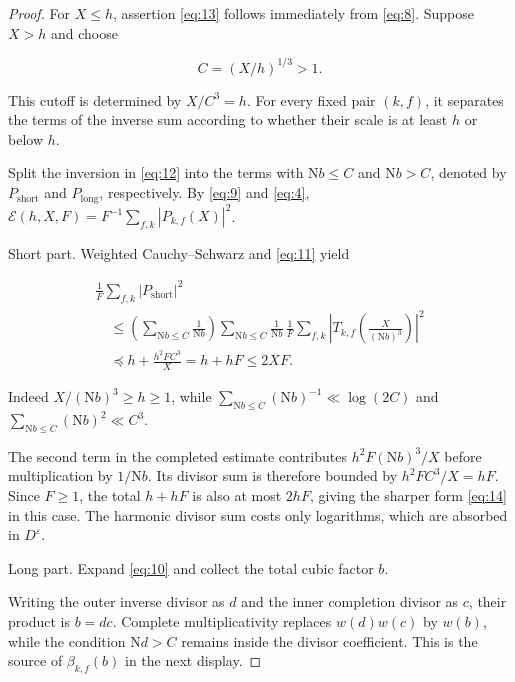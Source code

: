 \documentclass[reqno,a4paper,11pt]{amsart}
\begin{document}
\begin{proof}

For $X\le h$, assertion \eqref{eq:13} follows immediately from \eqref{eq:8}. Suppose $X>h$ and choose

\[
C={\left( X/h\right) }^{1/3}>1.
\]

This cutoff is determined by $X/C^3=h$. For every fixed pair $(k,f)$, it separates the terms of the inverse sum according to whether their scale is at least $h$ or below $h$.

Split the inversion in \eqref{eq:12} into the terms with $\mathrm{N}b\le C$ and $\mathrm{N}b>C$, denoted by ${P}_{\mathrm{short}}$ and ${P}_{\mathrm{long}}$, respectively. By \eqref{eq:9} and \eqref{eq:4}, $\mathcal{E}\left( h,X,F\right) ={F}^{-1}\sum _{f,k} {\left| {P}_{k,f}\left( X\right) \right| }^{2}$.

Short part. Weighted Cauchy--Schwarz and \eqref{eq:11} yield

\begin{equation}\label{eq:15}
\begin{gathered} \frac{1}{F}\sum _{f,k} {\left| {P}_{\mathrm{short}}\right| }^{2} \\ \quad \le \left( \sum _{\mathrm{N}b\le C} \frac{1}{\mathrm{N}b}\right) \sum _{\mathrm{N}b\le C} \frac{1}{\mathrm{N}b}\,\frac{1}{F}\sum _{f,k} {\left| {T}_{k,f}\left( \frac{X}{{\left( \mathrm{N}b\right) }^{3}}\right) \right| }^{2} \\ \quad \preccurlyeq h+\frac{{h}^{2}F{C}^{3}}{X}=h+hF\le 2XF. \end{gathered}
\end{equation}

Indeed $X/{\left( \mathrm{N}b\right) }^{3}\ge h\ge 1$, while $\sum _{\mathrm{N}b\le C} {\left( \mathrm{N}b\right) }^{-1}\ll \log \left( 2C\right) $ and $\sum _{\mathrm{N}b\le C} {\left( \mathrm{N}b\right) }^{2}\ll {C}^{3}$.

The second term in the completed estimate contributes $h^2F(\mathrm{N}b)^3/X$ before multiplication by $1/\mathrm{N}b$. Its divisor sum is therefore bounded by $h^2FC^3/X=hF$. Since $F\ge1$, the total $h+hF$ is also at most $2hF$, giving the sharper form \eqref{eq:14} in this case. The harmonic divisor sum costs only logarithms, which are absorbed in $D^{\varepsilon}$.

Long part. Expand \eqref{eq:10} and collect the total cubic factor $b$.

Writing the outer inverse divisor as $d$ and the inner completion divisor as $c$, their product is $b=dc$. Complete multiplicativity replaces $w(d)w(c)$ by $w(b)$, while the condition $\mathrm{N}d>C$ remains inside the divisor coefficient. This is the source of $\beta_{k,f}(b)$ in the next display.


\end{proof}
\end{document}
